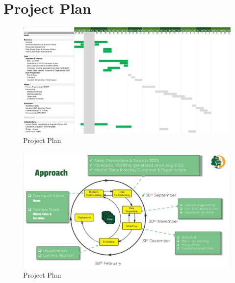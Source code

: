 \documentclass[
  american,
  10,
  a4paper,
]{book}
\theoremstyle{definition}
\theoremstyle{remark}
\begin{document}
\begin{landscape}
\begin{figure}[H]
{}

\end{figure}%

\section{Project Plan}\label{sec-project-plan}

\begin{figure}[H]

\caption{Project Plan}

{\centering \includegraphics[width=1\linewidth,height=\textheight,keepaspectratio]{nb/../images/project_plan.png}

}

\end{figure}%

\newpage{}

\begin{figure}[H]

\caption{Project Plan}

{\centering \includegraphics[width=0.8\linewidth,height=\textheight,keepaspectratio]{nb/../images/approach.png}

}

\end{figure}%

\newpage{}

\end{landscape}
\end{document}
